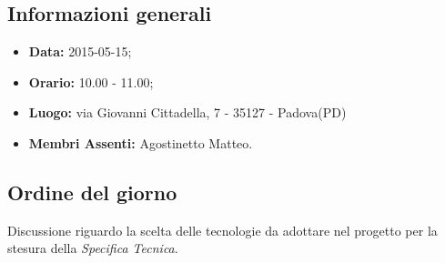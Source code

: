 \subsection{Informazioni generali}
\begin{itemize}
	\item \textbf{Data:} 2015-05-15;
	\item \textbf{Orario:} 10.00 - 11.00;
	\item \textbf{Luogo:} via Giovanni Cittadella, 7 - 35127 - Padova(PD)
	\item \textbf{Membri Assenti:} Agostinetto Matteo.
\end{itemize}

\subsection{Ordine del giorno}
Discussione riguardo la scelta delle tecnologie da adottare nel progetto per la stesura della \textit{Specifica Tecnica}.

